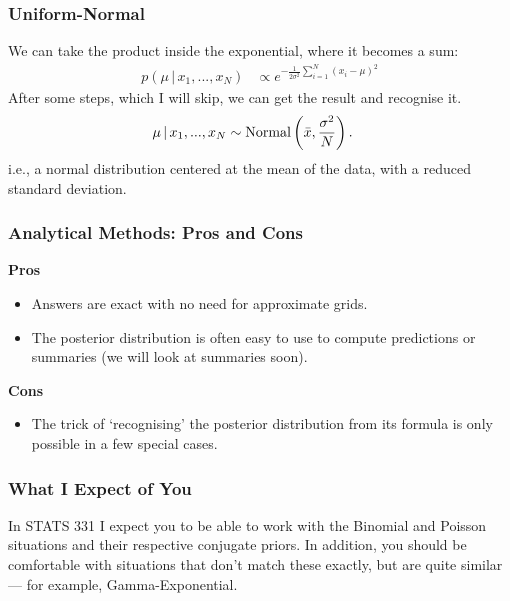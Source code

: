 \documentclass{beamer}
\newcommand{\given}{\,|\,}
\begin{document}
\begin{frame}
\frametitle{Uniform-Normal}
We can take the product inside the exponential, where it becomes a sum:
\begin{align}
p(\mu \given x_1, ..., x_N) &\propto
    e^{-\frac{1}{2\sigma^2}\sum_{i=1}^N(x_i - \mu)^2}
\end{align}
\pause
After some steps, which I will skip, we can get the result and recognise it.
\begin{align}
\mu \given x_1, ..., x_N &\sim \textnormal{Normal}\left(\bar{x}, \frac{\sigma^2}{N}\right).
\end{align}
\pause
i.e., a normal distribution centered at the mean of the data, with a reduced
standard deviation.



\end{frame}



\begin{frame}
\frametitle{Analytical Methods: Pros and Cons}

{\bf Pros}
\begin{itemize}
\item Answers are exact with no need for approximate grids.\pause
\item The posterior distribution is often easy to use to compute
    predictions or summaries (we will look at summaries soon).
\end{itemize}
\pause
{\bf Cons}
\begin{itemize}
\item The trick of `recognising' the posterior distribution from its formula
is only possible in a few special cases.
\end{itemize}


\end{frame}



\begin{frame}
\frametitle{What I Expect of You}
In STATS 331 I expect you to be able to work with the Binomial and
Poisson situations and their respective conjugate priors. In addition, you
should be comfortable with situations that don't match these exactly,
but are quite similar --- for example, Gamma-Exponential.

\end{frame}
\end{document}
